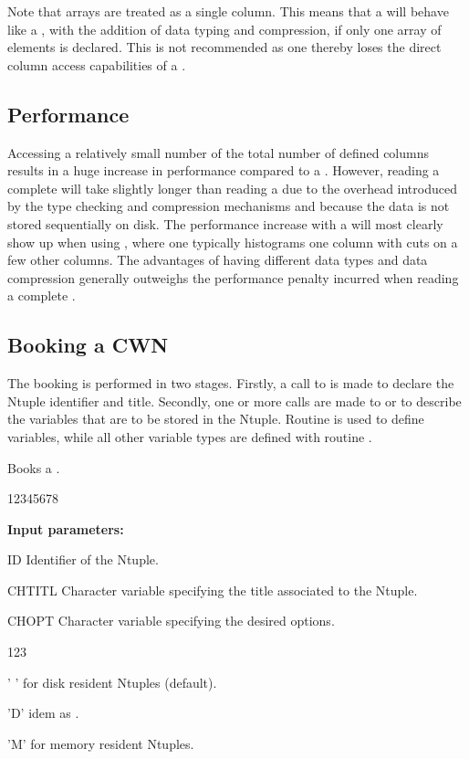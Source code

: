 Note that arrays are treated as a single column.
This means that a \CWN{} will behave like a \RWN{},
with the addition of data typing and compression,
if only one array of  elements is declared.
This is not recommended as one thereby loses
the direct column access capabilities of a \CWN{}.

\subsection*{Performance}

Accessing a relatively small number of the total number of
defined columns results in a huge increase in performance compared to
a \RWN{}.
However, reading a complete \CWN{} will take
slightly longer than reading a \RWN{} due to the overhead
introduced by the type checking and compression mechanisms and
because the data is not stored sequentially on disk.
The performance increase with a \CWN{} will most clearly show up when
using \PAW{}, where one typically histograms one
column with cuts on a few other columns.
The advantages of having different data types and data compression generally
outweighs the performance penalty incurred when reading a complete \CWN{}.


\subsection{Booking a CWN}
\label{HNTUBOOKT}

The booking is performed in two stages.
Firstly, a call to 
is made to declare the Ntuple identifier and title.
Secondly, one or more
calls are made to  or  to describe
the variables that are to be stored in the Ntuple.
Routine  is used to define  variables,
while all other variable types are defined with routine .


\Action
Books a \CWN.

\begin{DLttc}{12345678}
\item[{\rm\bf Input parameters:}]
\item[ID]     Identifier of the Ntuple.
\item[CHTITL] Character variable specifying the title associated to the Ntuple.
\item[CHOPT]  Character variable specifying the desired options.
   \begin{DLttc}{123}
     \item[' '] for disk resident Ntuples (default).
     \item['D'] idem as .
     \item['M'] for memory resident Ntuples.
   \end{DLttc}
\end{DLttc}

